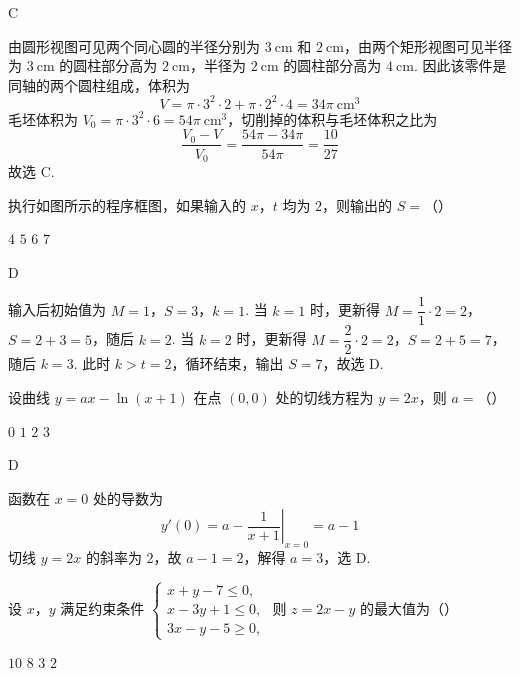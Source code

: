 \begin{answer}
C
\end{answer}

\begin{solution}
由圆形视图可见两个同心圆的半径分别为 \(3\mathrm{~cm}\) 和 \(2\mathrm{~cm}\)，由两个矩形视图可见半径为 \(3\mathrm{~cm}\) 的圆柱部分高为 \(2\mathrm{~cm}\)，半径为 \(2\mathrm{~cm}\) 的圆柱部分高为 \(4\mathrm{~cm}\). 因此该零件是同轴的两个圆柱组成，体积为
\[
V=\pi\cdot3^2\cdot2+\pi\cdot2^2\cdot4=34\pi\mathrm{~cm}^3
\]
毛坯体积为 \(V_0=\pi\cdot3^2\cdot6=54\pi\mathrm{~cm}^3\)，切削掉的体积与毛坯体积之比为
\[
\frac{V_0-V}{V_0}=\frac{54\pi-34\pi}{54\pi}=\frac{10}{27}
\]
故选 C.
\end{solution}

\begin{problem}
执行如图所示的程序框图，如果输入的 \(x\)，\(t\) 均为 \(2\)，则输出的 \(S=\)（\quad）


\choices
    {\(4\)}
    {\(5\)}
    {\(6\)}
    {\(7\)}
\end{problem}

\begin{answer}
D
\end{answer}

\begin{solution}
输入后初始值为 \(M=1\)，\(S=3\)，\(k=1\). 当 \(k=1\) 时，更新得
\(M=\dfrac{1}{1}\cdot2=2\)，\(S=2+3=5\)，随后 \(k=2\). 当 \(k=2\) 时，更新得
\(M=\dfrac{2}{2}\cdot2=2\)，\(S=2+5=7\)，随后 \(k=3\). 此时 \(k>t=2\)，循环结束，输出 \(S=7\)，故选 D.
\end{solution}

\begin{problem}
设曲线 \(y=ax-\ln\left(x+1\right)\) 在点 \((0,0)\) 处的切线方程为 \(y=2x\)，则 \(a=\)（\quad）

\choices
    {\(0\)}
    {\(1\)}
    {\(2\)}
    {\(3\)}
\end{problem}

\begin{answer}
D
\end{answer}

\begin{solution}
函数在 \(x=0\) 处的导数为
\[
y'(0)=\left.a-\frac{1}{x+1}\right|_{x=0}=a-1
\]
切线 \(y=2x\) 的斜率为 \(2\)，故 \(a-1=2\)，解得 \(a=3\)，选 D.
\end{solution}

\begin{problem}
设 \(x\)，\(y\) 满足约束条件 \(\begin{cases}
x+y-7\leqslant 0,\\
x-3y+1\leqslant 0,\\
3x-y-5\geqslant 0,
\end{cases}\) 则 \(z=2x-y\) 的最大值为（\quad）

\choices
    {\(10\)}
    {\(8\)}
    {\(3\)}
    {\(2\)}
\end{problem}

